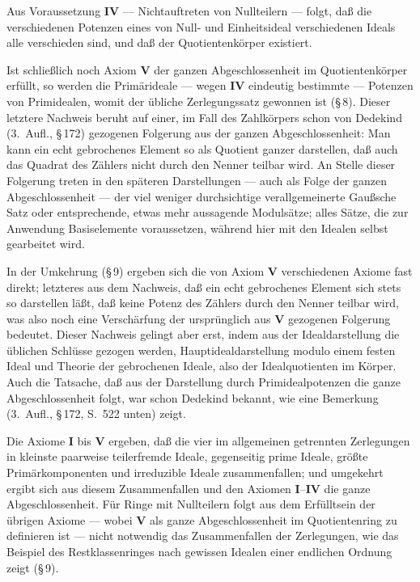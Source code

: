 \documentclass[12pt,a4paper]{article}
\theoremstyle{plain}
\theoremstyle{definition}
\theoremstyle{remark}
\begin{document}
Aus Voraussetzung \textbf{IV} --- Nichtauftreten von Nullteilern --- folgt, daß die verschiedenen Potenzen eines von Null- und Einheitsideal verschiedenen Ideals alle verschieden sind, und daß der Quotientenkörper existiert.

Ist schließlich noch Axiom \textbf{V} der ganzen Abgeschlossenheit im Quotientenkörper erfüllt, so werden die Primärideale --- wegen \textbf{IV} eindeutig bestimmte --- Potenzen von Primidealen, womit der übliche Zerlegungssatz gewonnen ist (\S\,8). Dieser letztere Nachweis beruht auf einer, im Fall des Zahlkörpers schon von Dedekind (3.~Aufl., \S\,172) gezogenen Folgerung aus der ganzen Abgeschlossenheit: Man kann ein echt gebrochenes Element so als Quotient ganzer darstellen, daß auch das Quadrat des Zählers nicht durch den Nenner teilbar wird. An Stelle dieser Folgerung treten in den späteren Darstellungen --- auch als Folge der ganzen Abgeschlossenheit --- der viel weniger durchsichtige verallgemeinerte Gaußsche Satz oder entsprechende, etwas mehr aussagende Modulsätze; alles Sätze, die zur Anwendung Basiselemente voraussetzen, während hier mit den Idealen selbst gearbeitet wird.

In der Umkehrung (\S\,9) ergeben sich die von Axiom \textbf{V} verschiedenen Axiome fast direkt; letzteres aus dem Nachweis, daß ein echt gebrochenes Element sich stets so darstellen läßt, daß keine Potenz des Zählers durch den Nenner teilbar wird, was also noch eine Verschärfung der ursprünglich aus \textbf{V} gezogenen Folgerung bedeutet. Dieser Nachweis gelingt aber erst, indem aus der Idealdarstellung die üblichen Schlüsse gezogen werden, Hauptidealdarstellung modulo einem festen Ideal und Theorie der gebrochenen Ideale, also der Idealquotienten im Körper. Auch die Tatsache, daß aus der Darstellung durch Primidealpotenzen die ganze Abgeschlossenheit folgt, war schon Dedekind bekannt, wie eine Bemerkung (3.~Aufl., \S\,172, S.~522 unten) zeigt.

Die Axiome \textbf{I} bis \textbf{V} ergeben, daß die vier im allgemeinen getrennten Zerlegungen in kleinste paarweise teilerfremde Ideale, gegenseitig prime Ideale, größte Primärkomponenten und irreduzible Ideale zusammenfallen; und umgekehrt ergibt sich aus diesem Zusammenfallen und den Axiomen \textbf{I}--\textbf{IV} die ganze Abgeschlossenheit. Für Ringe mit Nullteilern folgt aus dem Erfülltsein der übrigen Axiome --- wobei \textbf{V} als ganze Abgeschlossenheit im Quotientenring zu definieren ist --- nicht notwendig das Zusammenfallen der Zerlegungen, wie das Beispiel des Restklassenringes nach gewissen Idealen einer endlichen Ordnung zeigt (\S\,9).
\end{document}
